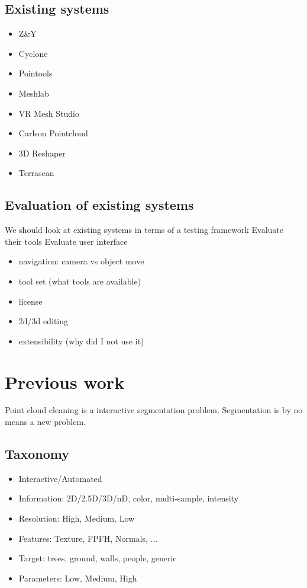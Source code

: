 	\subsection{Existing systems}
		\begin{itemize}
			\item Z\&Y
			\item Cyclone
			\item Pointools
			\item Meshlab
			\item VR Mesh Studio
			\item Carlson Pointcloud
			\item 3D Reshaper
			\item Terrascan
		\end{itemize}

	\subsection{Evaluation of existing systems}
	We should look at existing systems in terms of a testing framework
	Evaluate their tools
	Evaluate user interface
	\begin{itemize}
		\item navigation: camera vs object move
		\item tool set (what tools are available)
		\item license
		\item 2d/3d editing
		\item extensibility (why did I not use it)
	\end{itemize}


\section{Previous work}
Point cloud cleaning is a interactive segmentation problem. Segmentation is by no means a new problem.

\subsection{Taxonomy}
\begin{itemize}
	\item Interactive/Automated
	\item Information: 2D/2.5D/3D/nD, color, multi-sample, intensity
	\item Resolution: High, Medium, Low
	\item Features: Texture, FPFH, Normals, ...
	\item Target: trees, ground, walls, people, generic
	\item Parameters: Low, Medium, High
\end{itemize}


